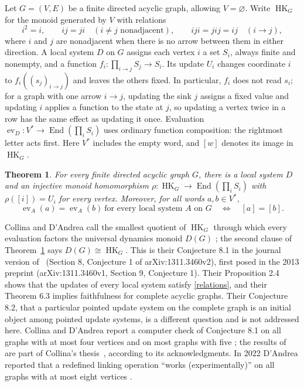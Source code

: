 \documentclass[11pt]{article}
\newtheorem{theorem}{Theorem}
\newcommand{\HK}{\operatorname{HK}}
\newcommand{\ev}{\operatorname{ev}}
\newcommand{\End}{\operatorname{End}}
\begin{document}
Let $G=(V,E)$ be a finite directed acyclic graph, allowing $V=\varnothing$.
Write $\HK_G$ for the monoid generated by $V$ with relations
\begin{equation}\label{relations}
 i^2=i,\qquad ij=ji\quad(i\ne j\text{ nonadjacent}),\qquad
 iji=jij=ij\quad(i\to j),
\end{equation}
where $i$ and $j$ are nonadjacent when there is no arrow between them in
either direction. A local system $D$ on $G$ assigns each vertex $i$ a set
$S_i$, always finite and nonempty, and a function
$f_i:\prod_{i\to j} S_j\to S_i$. Its update $U_i$ changes coordinate $i$ to
$f_i((s_j)_{i\to j})$ and leaves the others fixed. In particular, $f_i$ does
not read $s_i$; for a graph with one arrow $i\to j$, updating the sink $j$
assigns a fixed value and updating $i$ applies a function to the state at
$j$, so updating a vertex twice in a row has the same effect as updating it
once. Evaluation $\ev_D:V^*\to\End(\prod_i S_i)$ uses ordinary function
composition: the rightmost letter acts first. Here $V^*$ includes the empty
word, and $[w]$ denotes its image in $\HK_G$.

\begin{theorem}\label{main}
For every finite directed acyclic graph $G$, there is a local system $D$
and an injective monoid homomorphism
$\rho:\HK_G\to\End(\prod_i S_i)$ with $\rho([i])=U_i$ for every vertex.
Moreover, for all words $a,b\in V^*$,
\[
 \ev_A(a)=\ev_A(b)\ \text{for every local system $A$ on $G$}
 \quad\Longleftrightarrow\quad [a]=[b].
\]
\end{theorem}

Collina and D'Andrea call the smallest quotient of $\HK_G$ through which
every evaluation factors the universal dynamics monoid $D(G)$
\cite[Section 8]{CD}; the second clause of Theorem~\ref{main} says
$D(G)\cong\HK_G$. This is their Conjecture 8.1 in the journal version
of~\cite{CD} (Section 8, Conjecture 1 of arXiv:1311.3460v2), first posed in
the 2013 preprint (arXiv:1311.3460v1, Section 9, Conjecture 1). Their
Proposition 2.4 shows that the updates of every local system satisfy
\eqref{relations}, and their Theorem 6.3 implies faithfulness for complete
acyclic graphs. Their Conjecture 8.2, that a particular pointed update
system on the complete graph is an initial object among pointed update
systems, is a different question and is not addressed here. Collina and
D'Andrea report a computer check of Conjecture 8.1 on all graphs with at
most four vertices and on most graphs with five \cite[Section 8]{CD}; the results of~\cite{CD} are part of Collina's
thesis~\cite{Collina}, according to its acknowledgments. In 2022 D'Andrea
reported that a redefined linking operation ``works (experimentally)'' on
all graphs with at most eight vertices \cite[slide 21]{talk}.
\end{document}
